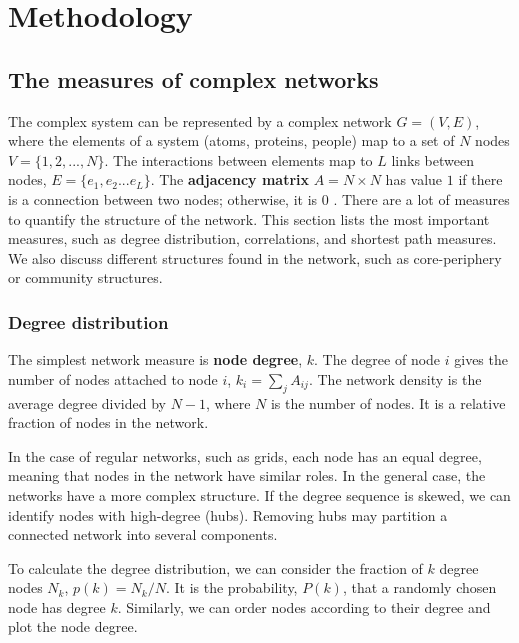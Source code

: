 \chapter{Methodology} %
\label{Ch:Method}

\section{The measures of complex networks}

The complex system can be represented by a complex network $G=(V, E)$, where the elements of a system (atoms, proteins, people) map to a set of $N$ nodes $V=\{1, 2, ..., N\}$. The interactions between elements map to $L$ links between nodes, $E = \{ e_1, e_2... e_L\}$. The \textbf{adjacency matrix} ${A} = N \times N$ has value $1$ if there is a connection between two nodes; otherwise, it is $0$ \cite{boccaletti2006complex}.
There are a lot of measures to quantify the structure of the network. This section lists the most important measures, such as degree distribution, correlations, and shortest path measures. We also discuss different structures found in the network, such as core-periphery or community structures.  

\subsection{Degree distribution}

The simplest network measure is \textbf{node degree}, $k$. The degree of node $i$ gives %
 the number of nodes attached %
 to node $i$, $k_i = \sum_j A_{ij}$. The network density is the average degree divided by $N-1$, where $N$ is the number of nodes. It is a relative fraction of nodes in the network.%
 
 In the case of regular networks, such as grids, each node has an equal degree, meaning that nodes in the network have similar roles. In the general case, the networks have a more complex structure. If the degree sequence is skewed, we can identify nodes with high-degree (hubs). Removing hubs may partition a connected network into several components. %

To calculate %
the degree distribution, we can consider the fraction of $k$ degree nodes $N_k$, $p(k) = N_k/N$. It is the probability, $P(k)$, that a randomly chosen node has degree $k$. Similarly, we can order nodes according to their degree and plot the node degree.


